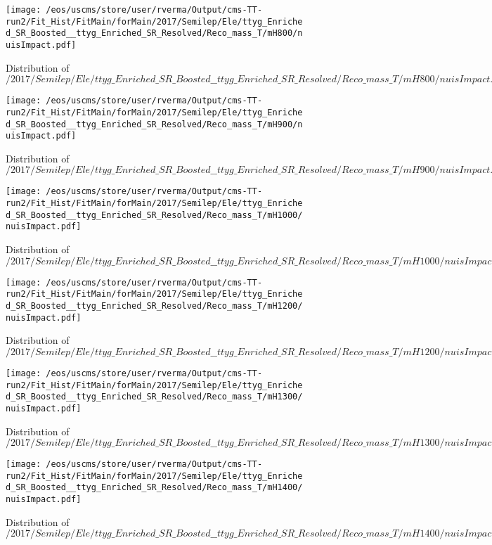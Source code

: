 \begin{figure}
\centering
\texttt{[image: /eos/uscms/store/user/rverma/Output/cms-TT-run2/Fit\_Hist/FitMain/forMain/2017/Semilep/Ele/ttyg\_Enriched\_SR\_Boosted\_\_ttyg\_Enriched\_SR\_Resolved/Reco\_mass\_T/mH800/nuisImpact.pdf]}
\caption{Distribution of $/2017/Semilep/Ele/ttyg\_Enriched\_SR\_Boosted\_\_ttyg\_Enriched\_SR\_Resolved/Reco\_mass\_T/mH800/nuisImpact.pdf$}
\end{figure}

\begin{figure}
\centering
\texttt{[image: /eos/uscms/store/user/rverma/Output/cms-TT-run2/Fit\_Hist/FitMain/forMain/2017/Semilep/Ele/ttyg\_Enriched\_SR\_Boosted\_\_ttyg\_Enriched\_SR\_Resolved/Reco\_mass\_T/mH900/nuisImpact.pdf]}
\caption{Distribution of $/2017/Semilep/Ele/ttyg\_Enriched\_SR\_Boosted\_\_ttyg\_Enriched\_SR\_Resolved/Reco\_mass\_T/mH900/nuisImpact.pdf$}
\end{figure}

\begin{figure}
\centering
\texttt{[image: /eos/uscms/store/user/rverma/Output/cms-TT-run2/Fit\_Hist/FitMain/forMain/2017/Semilep/Ele/ttyg\_Enriched\_SR\_Boosted\_\_ttyg\_Enriched\_SR\_Resolved/Reco\_mass\_T/mH1000/nuisImpact.pdf]}
\caption{Distribution of $/2017/Semilep/Ele/ttyg\_Enriched\_SR\_Boosted\_\_ttyg\_Enriched\_SR\_Resolved/Reco\_mass\_T/mH1000/nuisImpact.pdf$}
\end{figure}

\begin{figure}
\centering
\texttt{[image: /eos/uscms/store/user/rverma/Output/cms-TT-run2/Fit\_Hist/FitMain/forMain/2017/Semilep/Ele/ttyg\_Enriched\_SR\_Boosted\_\_ttyg\_Enriched\_SR\_Resolved/Reco\_mass\_T/mH1200/nuisImpact.pdf]}
\caption{Distribution of $/2017/Semilep/Ele/ttyg\_Enriched\_SR\_Boosted\_\_ttyg\_Enriched\_SR\_Resolved/Reco\_mass\_T/mH1200/nuisImpact.pdf$}
\end{figure}

\begin{figure}
\centering
\texttt{[image: /eos/uscms/store/user/rverma/Output/cms-TT-run2/Fit\_Hist/FitMain/forMain/2017/Semilep/Ele/ttyg\_Enriched\_SR\_Boosted\_\_ttyg\_Enriched\_SR\_Resolved/Reco\_mass\_T/mH1300/nuisImpact.pdf]}
\caption{Distribution of $/2017/Semilep/Ele/ttyg\_Enriched\_SR\_Boosted\_\_ttyg\_Enriched\_SR\_Resolved/Reco\_mass\_T/mH1300/nuisImpact.pdf$}
\end{figure}

\begin{figure}
\centering
\texttt{[image: /eos/uscms/store/user/rverma/Output/cms-TT-run2/Fit\_Hist/FitMain/forMain/2017/Semilep/Ele/ttyg\_Enriched\_SR\_Boosted\_\_ttyg\_Enriched\_SR\_Resolved/Reco\_mass\_T/mH1400/nuisImpact.pdf]}
\caption{Distribution of $/2017/Semilep/Ele/ttyg\_Enriched\_SR\_Boosted\_\_ttyg\_Enriched\_SR\_Resolved/Reco\_mass\_T/mH1400/nuisImpact.pdf$}
\end{figure}

